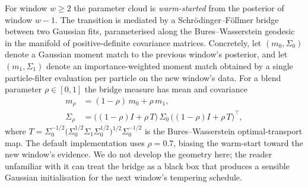For window $w \ge 2$ the parameter cloud is \emph{warm-started} from the
posterior of window $w-1$. The transition is mediated by a
Schr\"odinger--F\"ollmer bridge between two Gaussian fits, parameterised
along the Bures--Wasserstein geodesic in the manifold of positive-definite
covariance matrices. Concretely, let $(m_0,\Sigma_0)$ denote a Gaussian
moment match to the previous window's posterior, and let
$(m_1,\Sigma_1)$ denote an importance-weighted moment match obtained by
a single particle-filter evaluation per particle on the new window's data.
For a blend parameter $\rho \in [0,1]$ the bridge measure has mean and
covariance
\begin{align}
  m_\rho &= (1-\rho)\,m_0 + \rho\,m_1, \\
  \Sigma_\rho &= \bigl((1-\rho)I + \rho\,T\bigr)\,\Sigma_0\,
                 \bigl((1-\rho)I + \rho\,T\bigr)^{\!\top},
\end{align}
where $T = \Sigma_0^{-1/2}\bigl(\Sigma_0^{1/2}\Sigma_1\Sigma_0^{1/2}\bigr)^{1/2}\Sigma_0^{-1/2}$
is the Bures--Wasserstein optimal-transport map. The default
implementation uses $\rho = 0.7$, biasing the warm-start toward the new
window's evidence. We do not develop the geometry here; the reader
unfamiliar with it can treat the bridge as a black box that produces a
sensible Gaussian initialisation for the next window's tempering schedule.
